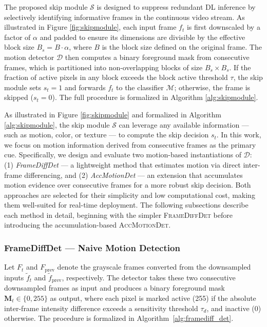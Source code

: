 \documentclass[
  10pt,
]{article}
\begin{document}
The proposed skip module \(\mathcal{S}\) is designed to suppress
redundant DL inference by selectively identifying informative frames in
the continuous video stream. As illustrated in Figure
\ref{fig:skipmodule}, each input frame \(f_t\) is first downscaled by a
factor of \(\alpha\) and padded to ensure its dimensions are divisible
by the effective block size \(B_s = B \cdot \alpha\), where \(B\) is the
block size defined on the original frame. The motion detector
\(\mathcal{D}\) then computes a binary foreground mask from consecutive
frames, which is partitioned into non-overlapping blocks of size
\(B_s \times B_s\). If the fraction of active pixels in any block
exceeds the block active threshold \(\tau\), the skip module sets
\(s_t = 1\) and forwards \(f_t\) to the classifier \(\mathcal{M}\);
otherwise, the frame is skipped (\(s_t = 0\)). The full procedure is
formalized in Algorithm \ref{alg:skipmodule}.

As illustrated in Figure \ref{fig:skipmodule} and formalized in
Algorithm \ref{alg:skipmodule}, the skip module \(\mathcal{S}\) can
leverage any available information --- such as motion, color, or texture
--- to compute the skip decision \(s_t\). In this work, we focus on
motion information derived from consecutive frames as the primary cue.
Specifically, we design and evaluate two motion-based instantiations of
\(\mathcal{D}\): (1) \textit{FrameDiffDet} --- a lightweight method that
estimates motion via direct inter-frame differencing, and (2)
\textit{AccMotionDet} --- an extension that accumulates motion evidence
over consecutive frames for a more robust skip decision. Both approaches
are selected for their simplicity and low computational cost, making
them well-suited for real-time deployment. The following subsections
describe each method in detail, beginning with the simpler
\textsc{FrameDiffDet} before introducing the accumulation-based
\textsc{AccMotionDet}.

\subsubsection{FrameDiffDet --- Naive Motion
Detection}\label{framediffdet-naive-motion-detection}

\noindent
Let $F_t$ and $F_{\text{prev}}$ denote the grayscale frames converted from the
downsampled inputs $\tilde{f}_t$ and $\tilde{f}_{\text{prev}}$, respectively.
The detector takes these two consecutive downsampled frames as input
and produces
a binary foreground mask $\mathbf{M}_t \in \{0, 255\}$ as output, where each
pixel is marked active (255) if the absolute inter-frame intensity difference
exceeds a sensitivity threshold $\tau_d$, and inactive (0) otherwise. The
procedure is formalized in Algorithm~\ref{alg:framediff_det}.
\end{document}
